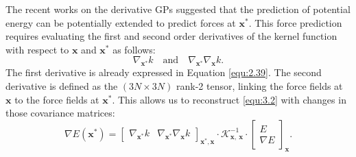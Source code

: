 The recent works \cite{GarijodelRo2019, Kaappa2021, Asnaashari2021, Deringer2021} on the derivative GPs suggested that the prediction of potential energy can be potentially extended to predict forces at $\mathbf{x}^{*}$.
This force prediction requires evaluating the first and second order derivatives of the kernel function with respect to $\mathbf{x}$ and $\mathbf{x}^{*}$ as follows:
\[\nabla_{\mathbf{x}^{*}} k \quad \text{and}\quad \nabla_{\mathbf{x}^{*}}\nabla_{\mathbf{x}} k.
\]
The first derivative is already expressed in Equation \eqref{equ:2.39}.
The second derivative is defined as the $(3N\times 3N)$ rank-2 tensor, linking the force fields at $\mathbf{x}$ to the force fields at $\mathbf{x}^{*}$.
This allows us to reconstruct \eqref{equ:3.2} with changes in those covariance matrices:
\begin{equation} \label{equ:3.5}
        \nabla E(\mathbf{x}^{*}) = 
        \begin{bmatrix}
             \nabla_{\mathbf{x}^{*}} k & \nabla_{\mathbf{x}^{*}}\nabla_{\mathbf{x}} k
        \end{bmatrix}_{\textbf{x}^{*},\textbf{x}}
        \cdot \mathcal{K}^{-1}_{\mathbf{x},\: \mathbf{x}}
        \cdot
        \begin{bmatrix}
              E \\
              \nabla E
        \end{bmatrix}_{\mathbf{x}}.
\end{equation}

